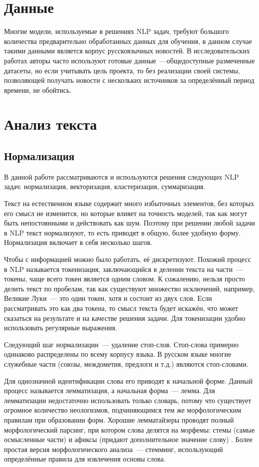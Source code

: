 \documentclass[a4paper, 14pt]{extarticle}
\begin{document}
\section{Данные}
Многие модели, используемые в решениях NLP задач, требуют большого количества предварительно обработанных данных для обучения, в данном случае такими данными является корпус русскоязычных новостей. В исследовательских работах авторы часто используют готовые данные~---общедоступные размеченные датасеты, но если учитывать цель проекта, то без реализации своей системы, позволяющей получать новости с нескольких источников за определённый период времени, не обойтись.

\section{Анализ текста}
\subsection{Нормализация}
В данной работе рассматриваются и используются решения следующих NLP задач: нормализация, векторизация, кластеризация, суммаризация.

Текст на естественном языке содержит много избыточных элементов, без которых его смысл не изменится, но которые влияет на точность моделей, так как могут быть непостоянными и действовать как шум. Поэтому при решении любой задачи в NLP текст нормализуют, то есть приводят в общую, более удобную форму. Нормализация включает в себя несколько шагов.

Чтобы с информацией можно было работать, её дискретизуют. Похожий процесс в NLP называется токенизация, заключающийся в делении текста на части~--- токены, чаще всего токен является одним словом. К сожалению, нельзя просто делить текст по пробелам, так как существуют множество исключений, например, Великие Луки~--- это один токен, хотя и состоит из двух слов. Если рассматривать это как два токена, то смысл текста будет искажён, что может сказаться на результате и на качестве решения задачи. Для токенизации удобно использовать регулярные выражения.

Следующий шаг нормализации~--- удаление стоп-слов. Стоп-слова примерно одинаково распределены по всему корпусу языка. В русском языке многие служебные части (союзы, междометия, предлоги и т.д.) являются стоп-словами.

Для однозначной идентификации слова его приводят к начальной форме. Данный процесс называется лемматизация, а начальная форма~--- лемма. Для лемматизации недостаточно использовать только словарь, потому что существует огромное количество неологизмов, подчиняющимся тем же морфологическим правилам при образовании форм. Хорошие лемматайзеры проводят полный морфологический парсинг, при котором слова делятся на морфемы: стемы (самые осмысленные части) и афиксы (придают дополнительное значение слову) \cite{c2}. Более простая версия морфологического анализа~--- стемминг, использующий определённые правила для извлечения основы слова.
\end{document}
